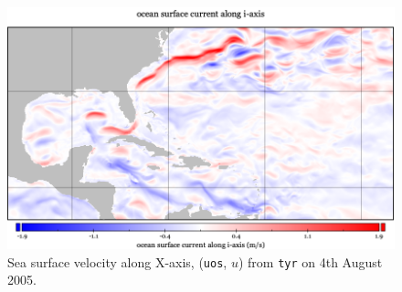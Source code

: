 \begin{figure}
\vspace{-10pt}
\includegraphics[width=\linewidth]{images/example-images/uos.png}
\caption{Sea surface velocity along X-axis,
         (\texttt{uos}, $u$) from \texttt{tyr}
         on 4th August 2005. }
\label{fig:uos}
\end{figure}
